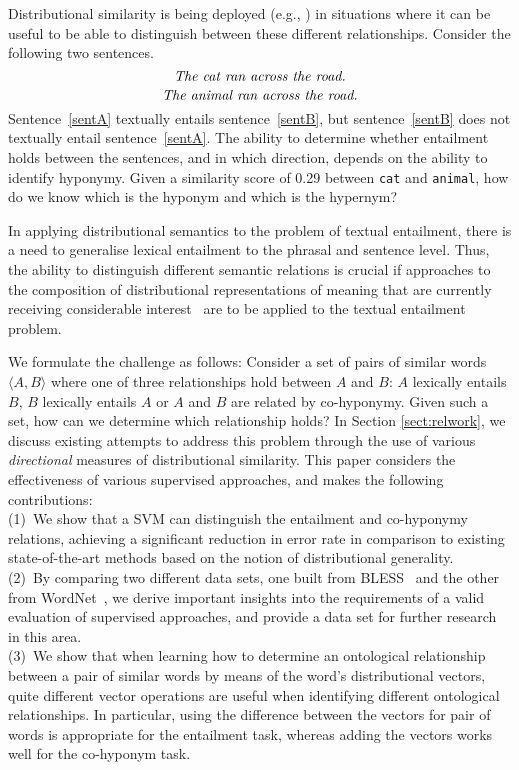 \documentclass[11pt]{article}
\begin{document}
Distributional similarity is being deployed (e.g., ) in situations where it can be useful to be able to distinguish between these different relationships. Consider the following two sentences.
\begin{equation}
\label{sentA}
\mbox{\em The cat ran across the road.}
\end{equation}
\begin{equation}
\label{sentB}
\mbox{\em The animal ran across the road.}
\end{equation}
Sentence~\ref{sentA} textually entails sentence~\ref{sentB}, but sentence~\ref{sentB} does not textually entail sentence~\ref{sentA}. The ability to determine whether entailment holds between the sentences, and in which direction, depends on the ability to identify hyponymy.   Given a similarity score of 0.29 between \texttt{cat} and \texttt{animal}, how do we know which is the hyponym and which is the hypernym? 

In applying distributional semantics to the problem of textual entailment, there is a need to generalise lexical entailment to the phrasal and sentence level. Thus, the ability to distinguish different semantic relations is crucial if approaches to the composition of distributional representations of meaning that are currently receiving considerable interest~\cite{Widdows:08,Mitchell:08,Baroni2010,Grefenstette:11,Socher:12} are to be applied to the textual entailment problem.

We formulate the challenge as follows: Consider a set of pairs of similar words $\langle A,B\rangle$ where one of three relationships hold between $A$ and $B$: $A$ lexically entails $B$, $B$ lexically entails $A$ or  $A$ and $B$ are related by co-hyponymy. Given such a set, how can we determine which relationship holds? In Section \ref{sect:relwork}, we discuss existing attempts to address this problem through the use of various \emph{directional} measures of distributional similarity.  This paper  considers the effectiveness of various supervised approaches, and makes the following contributions:\\[2pt]
(1)~We show that a SVM can distinguish the entailment and co-hyponymy relations, achieving a significant reduction in error rate in comparison to  existing state-of-the-art methods based on the notion of distributional generality.\\[2pt]
(2)~By comparing two  different data sets, one built from  BLESS~\cite{Baroni2011} and the other from WordNet~\cite{Fellbaum:98}, we derive important insights into the requirements of a valid evaluation of supervised approaches, and provide a data set for further research in this area.\\[2pt]
(3)~We show that when learning how to determine an ontological relationship between a pair of similar words by means of the word's distributional vectors, quite different vector operations are useful when identifying different ontological relationships. In particular, using the difference between the vectors for pair of words is appropriate for the entailment task, whereas adding the vectors works well for the co-hyponym task.
\end{document}
